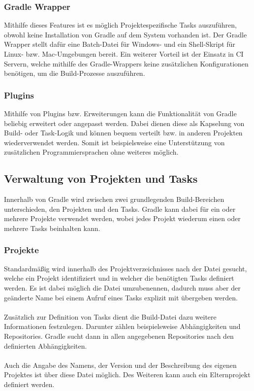 \subsubsection{Gradle Wrapper}
Mithilfe dieses Features ist es möglich Projektespezifische Tasks auszuführen, obwohl keine Installation von Gradle auf dem System vorhanden ist. Der Gradle Wrapper stellt dafür eine Batch-Datei für Windows- und ein Shell-Skript für Linux- bzw. Mac-Umgebungen bereit. Ein weiterer Vorteil ist der Einsatz in \gls{CI} Servern, welche mithilfe des Gradle-Wrappers keine zusätzlichen Konfigurationen benötigen, um die Build-Prozesse auszuführen.

\subsubsection{Plugins}
Mithilfe von Plugins bzw. Erweiterungen kann die Funktionalität von Gradle beliebig erweitert oder angepasst werden. Dabei dienen diese als Kapselung von Build- oder Task-Logik und können bequem verteilt bzw. in anderen Projekten wiederverwendet werden. Somit ist beispielsweise eine Unterstützung von zusätzlichen Programmiersprachen ohne weiteres möglich.

\subsection{Verwaltung von Projekten und Tasks}
Innerhalb von Gradle  wird zwischen zwei grundlegenden Build-Bereichen unterschieden, den Projekten und den Tasks. Gradle kann dabei für ein oder mehrere Projekte verwendet werden, wobei jedes Projekt wiederum einen oder mehrere Tasks beinhalten kann.

\subsubsection{Projekte}
Standardmäßig wird innerhalb des Projektverzeichnisses nach der Datei  gesucht, welche ein Projekt identifiziert und in welcher die benötigten Tasks definiert werden. Es ist dabei möglich die  Datei umzubenennen, dadurch muss aber der geänderte Name bei einem Aufruf eines Tasks explizit mit übergeben werden.\\
\\
Zusätzlich zur Definition von Tasks dient die Build-Datei dazu weitere Informationen festzulegen. Darunter zählen beispielsweise Abhängigkeiten und Repositories. Gradle sucht dann in allen angegebenen Repositories nach den definierten Abhängigkeiten.\\
\\
Auch die Angabe des Namens, der Version und der Beschreibung des eigenen Projektes ist über diese Datei möglich. Des Weiteren kann auch ein Elternprojekt definiert werden.

